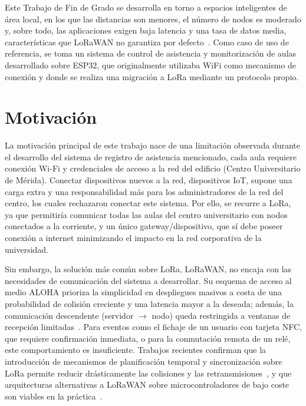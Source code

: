 Este Trabajo de Fin de Grado se desarrolla en torno a espacios inteligentes de área local, en los que las distancias son menores, el número de nodos es moderado y, sobre todo, las aplicaciones exigen baja latencia y una tasa de datos media, características que LoRaWAN no garantiza por defecto~\cite{farahani2026sdlora,arregui2025gatewayfree}. Como caso de uso de referencia, se toma un sistema de control de asistencia y monitorización de aulas desarrollado sobre ESP32, que originalmente utilizaba WiFi como mecanismo de conexión y donde se realiza una migración a LoRa mediante un protocolo propio.






\section{Motivación}

La motivación principal de este trabajo nace de una limitación observada durante el desarrollo del sistema de registro de asistencia mencionado, cada aula requiere conexión Wi-Fi y credenciales de acceso a la red del edificio (Centro Universitario de Mérida). Conectar dispositivos nuevos a la red, dispositivos IoT, supone una carga extra y una responsabilidad más para los administradores de la red del centro, los cuales rechazaron conectar este sistema. Por ello, se recurre a LoRa, ya que permitiría comunicar todas las aulas del centro universitario con nodos conectados a la corriente, y un único gateway/dispositivo, que sí debe poseer conexión a internet minimizando el impacto en la red corporativa de la universidad.

Sin embargo, la solución más común sobre LoRa, LoRaWAN, no encaja con las necesidades de comunicación del sistema a desarrollar. Su esquema de acceso al medio ALOHA prioriza la simplicidad en despliegues masivos a costa de una probabilidad de colisión creciente y una latencia mayor a la deseada; además, la comunicación descendente (servidor $\rightarrow$ nodo) queda restringida a ventanas de recepción limitadas~\cite{sornin2015lorawan,farahani2026sdlora}. Para eventos como el fichaje de un usuario con tarjeta NFC, que requiere confirmación inmediata, o para la conmutación remota de un relé, este comportamiento es insuficiente. Trabajos recientes confirman que la introducción de mecanismos de planificación temporal y sincronización sobre LoRa permite reducir drásticamente las colisiones y las retransmisiones~\cite{farahani2026sdlora}, y que arquitecturas alternativas a LoRaWAN sobre microcontroladores de bajo coste son viables en la práctica~\cite{arregui2025gatewayfree}.


